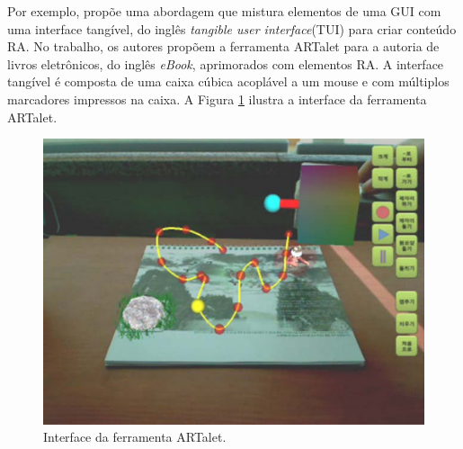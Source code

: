 \documentclass[../main.tex]{subfiles}
\begin{document}
Por exemplo,  propõe uma abordagem que mistura elementos de uma GUI com uma interface tangível, do inglês \emph{tangible user interface}(TUI) para criar conteúdo RA. No trabalho, os autores propõem a ferramenta ARTalet para a autoria de livros eletrônicos, do inglês \emph{eBook}, aprimorados com elementos RA. A interface tangível é composta de uma caixa cúbica acoplável a um mouse e com múltiplos marcadores impressos na caixa. A Figura \ref{fig:ha} ilustra a interface da ferramenta ARTalet. 

\begin{figure}[!h]
\centering
\includegraphics[width=.5\linewidth]{IMG/Relacionados/ha.png}
\caption{Interface da ferramenta ARTalet.}
\label{fig:ha}
\end{figure}
\end{document}
